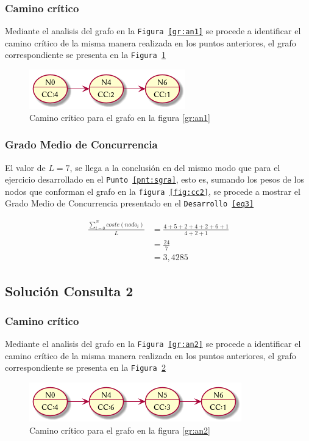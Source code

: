 \documentclass{article}
\begin{document}
\subsubsection{Camino cr\'itico}
Mediante el analisis del grafo en la \texttt{Figura \ref{gr:an1}} se procede
a identificar el camino cr\'itico de la misma manera realizada en los puntos anteriores,
el grafo correspondiente se presenta en la \texttt{Figura \ref{fig:an1_cc}}
\begin{figure}[H]
  \centering
  \includegraphics[width=.4\linewidth]{gr_an1_cc}
  \caption{Camino cr\'itico para el grafo en la figura \ref{gr:an1}}
  \label{fig:an1_cc}
\end{figure}

\subsubsection{Grado Medio de Concurrencia}
El valor de $L=7$, se llega a la conclusi\'on en del mismo modo que para el
ejercicio desarrollado en el \texttt{Punto \ref{pnt:sgra}}, esto es, sumando
los pesos de los nodos que conforman
el grafo en la \texttt{figura \ref{fig:cc2}}, se procede a mostrar
el Grado Medio de Concurrencia presentado en el \texttt{Desarrollo \ref{eq3}}

\begin{equation} \label{eq3}
\begin{split}
\frac{\sum_{i=0}^{N} coste(nodo_{i})}{L} & =  \frac{4 + 5 + 2 + 4 + 2 + 6 + 1}{4 + 2 + 1} \\
 & = \frac{24}{7} \\
 & = 3,4285
\end{split}
\end{equation}

\subsection{Soluci\'on Consulta 2}
\subsubsection{Camino cr\'itico}
Mediante el analisis del grafo en la \texttt{Figura
\ref{gr:an2}} se procede a identificar el camino cr\'itico de la misma manera
realizada en los puntos anteriores, el grafo correspondiente se presenta en la
\texttt{Figura \ref{fig:an2_cc}}
\begin{figure}[H]
  \centering
  \includegraphics[width=.4\linewidth]{gr_an2_cc}
  \caption{Camino cr\'itico para el grafo en la figura \ref{gr:an2}}
  \label{fig:an2_cc}
\end{figure}
\end{document}

